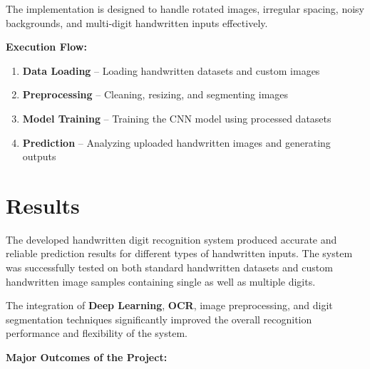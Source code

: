 \documentclass[12pt,a4paper]{article}
\begin{document}
\vspace{0.3cm}

\noindent
The implementation is designed to handle rotated images, irregular spacing, noisy backgrounds, and multi-digit handwritten inputs effectively.

\vspace{0.4cm}

\noindent
\textbf{Execution Flow:}

\begin{enumerate}

\item \textbf{Data Loading} -- Loading handwritten datasets and custom images

\item \textbf{Preprocessing} -- Cleaning, resizing, and segmenting images

\item \textbf{Model Training} -- Training the CNN model using processed datasets

\item \textbf{Prediction} -- Analyzing uploaded handwritten images and generating outputs

\end{enumerate}

\newpage

\section{Results}

\vspace{0.3cm}

\noindent
The developed handwritten digit recognition system produced accurate and reliable prediction results for different types of handwritten inputs. The system was successfully tested on both standard handwritten datasets and custom handwritten image samples containing single as well as multiple digits.

\vspace{0.3cm}

\noindent
The integration of \textbf{Deep Learning}, \textbf{OCR}, image preprocessing, and digit segmentation techniques significantly improved the overall recognition performance and flexibility of the system.

\vspace{0.4cm}

\noindent
\textbf{Major Outcomes of the Project:}
\end{document}
